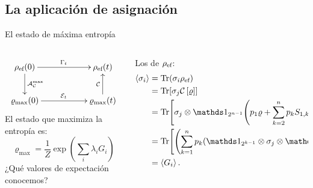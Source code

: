 \subsection{La aplicación de asignación}
\begin{frame}{El estado de máxima entropía}
    \begin{columns}
        \begin{column}{0.5\textwidth}
            \begin{displaymath}
                \xymatrix{
                  {\rho_{\ef}(0)} \ar[rr]^{\Gamma_{t}} \ar[d]^{\mcA_{\mcC}^{\max}}
                  && {\rho_{\ef}(t)}\\
                  {\varrho_{\max}(0)} \ar[rr]^{\mcE_{t}}
                  && {\varrho_{\max}(t)} \ar[u]^{\mcC}
                }
              \end{displaymath}
              El estado que maximiza la entropía es:
              \begin{equation}
                  \varrho_{\max}=\frac{1}{Z}\exp(\sum_{i}\lambda_{i}G_{i})\nonumber
              \end{equation}\pause
              ¿Qué valores de expectación conocemos?
        \end{column}
        \begin{column}{0.5\textwidth}
            Los de $\rho_{\text{ef}}$\pause:
            \begin{align}
                \expval{\pauli{i}}&=\Tr(\pauli{i}\rho_{\ef})\nonumber\\
                &=\Tr[\sigma_{j}\CG{\varrho}]\nonumber\\
                &=\Tr[\sigma_{j}\otimes\Id_{2^{n-1}}\qty(p_{1}\varrho+\sum_{k=2}^{n}p_{k}S_{1,k}\varrho S_{1,k})]\nonumber\\
                &=\Tr[\qty(\sum_{k=1}^{n}p_{k}(\Id_{2^{k-1}}\otimes\sigma_{j}\otimes\Id_{2^{n-k}}))\varrho]\nonumber\\
                &=\expval{G_{i}}.\nonumber
            \end{align}
        \end{column}
    \end{columns}
\end{frame}

